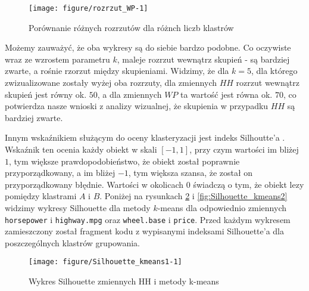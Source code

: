 \documentclass[12pt, a4paper]{article}\usepackage[]{graphicx}\usepackage[]{xcolor}
\makeatletter
\def\maxwidth{ %
  \ifdim\Gin@nat@width>\linewidth
    \linewidth
  \else
    \Gin@nat@width
  \fi
}
\newenvironment{knitrout}{}{} %
\makeatother
\begin{document}
\begin{knitrout}
\color{fgcolor}\begin{figure}[H]

{\centering \texttt{[image: figure/rozrzut\_WP-1]} 

}

\caption[Porównanie różnych rozrzutów dla różnch liczb klastrów]{Porównanie różnych rozrzutów dla różnch liczb klastrów}\label{fig:rozrzut_WP}
\end{figure}

\end{knitrout}
Możemy zauważyć, że oba wykresy są do siebie bardzo podobne. Co oczywiste wraz ze wzrostem parametru $k$, maleje rozrzut wewnątrz skupień - są bardziej zwarte, a rośnie rzorzut między skupieniami. Widzimy, że dla $k=5$, dla którego zwizualizowane zostały wyżej oba rozrzuty, dla zmiennych $HH$ rozrzut wewnątrz skupień jest równy ok. $50$, a dla zmiennych $WP$ ta wartość jest równa ok. $70$, co potwierdza nasze wnioski z analizy wizualnej, że skupienia w przypadku $HH$ są bardziej zwarte.  

\par
Innym wskaźnikiem służącym do oceny klasteryzacji jest indeks Silhoutte'a \cite{silhoutette}. Wskaźnik ten ocenia każdy obiekt w skali $[-1,1]$, przy czym wartości im bliżej $1$, tym większe prawdopodobieństwo, że obiekt został poprawnie przyporządkowany, a im bliżej $-1$, tym większa szansa, że został on przyporządkowany błędnie. Wartości w okolicach $0$ świadczą o tym, że obiekt lezy pomiędzy klastrami $A$ i $B$. Poniżej na rysunkach \ref{fig:Silhouette_kmeans1} i \ref{fig:Silhouette_kmeans2} widzimy wykresy Silhouette dla metody $k$-means dla odpowiednio zmiennych \texttt{horsepower} i \texttt{highway.mpg} oraz \texttt{wheel.base} i \texttt{price}. Przed każdym wykresem zamieszczony został fragment kodu z wypisanymi indeksami Silhouette'a dla poszczególnych klastrów grupowania.

\begin{knitrout}
\color{fgcolor}\begin{figure}[H]

{\centering \texttt{[image: figure/Silhouette\_kmeans1-1]} 

}

\caption[Wykres Silhouette zmiennych HH i metody k-means]{Wykres Silhouette zmiennych HH i metody k-means}\label{fig:Silhouette_kmeans1}
\end{figure}

\end{knitrout}
\end{document}
